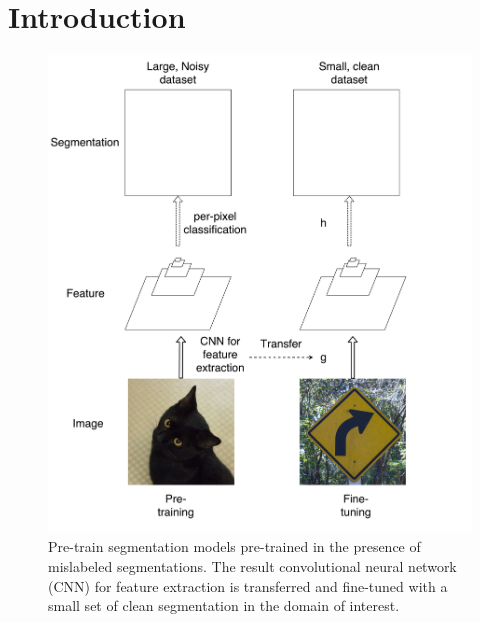 \section{Introduction}
\label{introduction}




\begin{figure}[t]
\begin{center}
   \includegraphics[width=1.05\linewidth]{img/figure1}
\end{center}
   \caption{
   Pre-train segmentation models pre-trained in the presence of mislabeled segmentations.
   The result convolutional neural network (CNN) for feature extraction is transferred and fine-tuned with a small set of clean segmentation in the domain of interest.
   }
\label{fig:figure1}
\end{figure}



